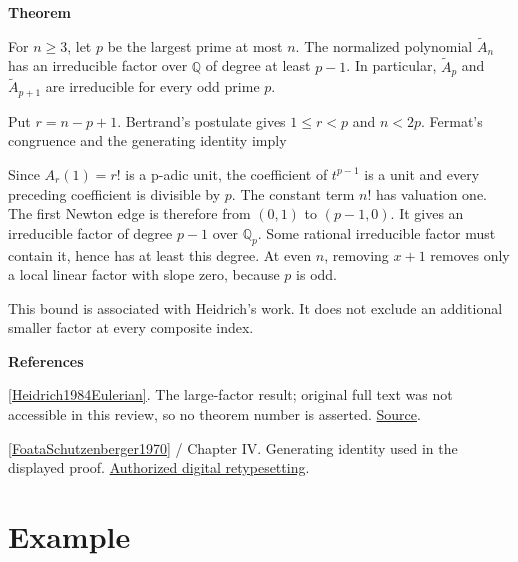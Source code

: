 \documentclass[11pt,a4paper,oneside,openany]{book}
\newcommand{\atlasdisplay}[1]{\par\begingroup\centering\vspace{3pt}\noindent\adjustbox{max width=\linewidth}{\(\displaystyle #1\)}\par\vspace{5pt}\endgroup}
\newenvironment{sources}{\par\smallskip\begingroup\footnotesize\color{atlasgray}\leftskip=10pt\setlength{\parskip}{2pt}}{\par\endgroup\smallskip}
\begin{document}
\begin{atlasblock}[standard]
\textbf{\sffamily Theorem}\par\smallskip
\color{black} For \(n\ge3\), let \(p\) be the largest prime at most \(n\). The normalized polynomial \(\widetilde A_n\) has an irreducible factor over \(\mathbb Q\) of degree at least \(p-1\). In particular, \(\widetilde A_p\) and \(\widetilde A_{p+1}\) are irreducible for every odd prime \(p\).\par
\end{atlasblock}\color{black}

\begin{atlasblock}[standard]
\color{black} Put \(r=n-p+1\). Bertrand's postulate gives \(1\le r<p\) and \(n<2p\). Fermat's congruence and the generating identity imply\par

\atlasdisplay{A_n(1+t)\equiv t^{p-1}A_r(1+t)\pmod p.}
\color{black} Since \(A_r(1)=r!\) is a p-adic unit, the coefficient of \(t^{p-1}\) is a unit and every preceding coefficient is divisible by \(p\). The constant term \(n!\) has valuation one. The first Newton edge is therefore from \((0,1)\) to \((p-1,0)\). It gives an irreducible factor of degree \(p-1\) over \(\mathbb Q_p\). Some rational irreducible factor must contain it, hence has at least this degree. At even \(n\), removing \(x+1\) removes only a local linear factor with slope zero, because \(p\) is odd.\par
\end{atlasblock}\color{black}
\color{black} This bound is associated with Heidrich's work. It does not exclude an additional smaller factor at every composite index.\par
\begin{sources}
\textbf{References}\par\smallskip
\noindent\hyperlink{ref:Heidrich1984Eulerian}{[Heidrich1984Eulerian]}. The large-factor result; original full text was not accessible in this review, so no theorem number is asserted. \href{https://doi.org/10.1016/0022-314X(84)90050-7}{Source}.\par
\noindent\hyperlink{ref:FoataSchutzenberger1970}{[FoataSchutzenberger1970]} / Chapter IV. Generating identity used in the displayed proof. \href{https://www.mat.univie.ac.at/~slc/books/foaschuetz.html}{Authorized digital retypesetting}.\par
\end{sources}\color{black}
\section{Example}
\end{document}
